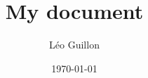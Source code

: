 
\usepackage[utf8]{inputenc}
\usepackage[T1]{fontenc}

\usepackage{lipsum}                         %


\usepackage{graphicx}                       %
\usepackage{color}                          %
\usepackage{photo}                          %

\usepackage{amsmath}                        %
\usepackage{amsfonts}
\usepackage{amssymb}       

\usepackage[french]{babel}                  %

\usepackage{listings}                       %

\usepackage{hyperref}                       %


\title{My document}
\author{Léo Guillon}
\date{\today}


\addto{\captionsfrench}{\renewcommand{\abstractname}{Résumé}}
\addto{\captionsfrench}{\renewcommand{\contentsname}{Sommaire}} %